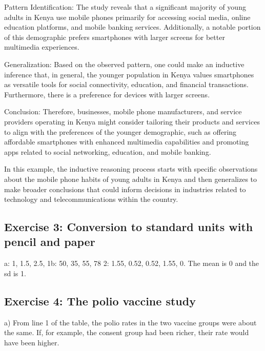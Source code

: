 \documentclass[letterpaper,10pt,english]{jupyterBook}
\begin{document}
\sphinxAtStartPar
Pattern Identification: The study reveals that a significant majority of young adults in Kenya use mobile phones primarily for accessing social media, online education platforms, and mobile banking services. Additionally, a notable portion of this demographic prefers smartphones with larger screens for better multimedia experiences.

\sphinxAtStartPar
Generalization: Based on the observed pattern, one could make an inductive inference that, in general, the younger population in Kenya values smartphones as versatile tools for social connectivity, education, and financial transactions. Furthermore, there is a preference for devices with larger screens.

\sphinxAtStartPar
Conclusion: Therefore, businesses, mobile phone manufacturers, and service providers operating in Kenya might consider tailoring their products and services to align with the preferences of the younger demographic, such as offering affordable smartphones with enhanced multimedia capabilities and promoting apps related to social networking, education, and mobile banking.

\sphinxAtStartPar
In this example, the inductive reasoning process starts with specific observations about the mobile phone habits of young adults in Kenya and then generalizes to make broader conclusions that could inform decisions in industries related to technology and telecommunications within the country.


\subsection{Exercise 3: Conversion to standard units with pencil and paper}
\label{\detokenize{exercises_unit_3:exercise-3-conversion-to-standard-units-with-pencil-and-paper}}
\sphinxhyphen{}a: 1, \sphinxhyphen{}1.5, 2.5, 1\sphinxhyphen{}b: 50, 35, \sphinxhyphen{}55, 78
2: 1.55, \sphinxhyphen{}0.52, 0.52, \sphinxhyphen{}1.55, 0. The mean is 0 and the sd is 1.


\subsection{Exercise 4: The polio vaccine study}
\label{\detokenize{exercises_unit_3:exercise-4-the-polio-vaccine-study}}
\sphinxAtStartPar
a) From line 1 of the table, the polio rates in the two vaccine groups were about the same. If, for example, the consent group had been richer, their rate would have been higher.
\end{document}
